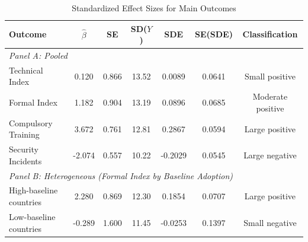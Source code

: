 \begin{table}[H]
\centering
\caption{Standardized Effect Sizes for Main Outcomes}
\label{tab:sde}
\begin{threeparttable}
\begin{tabular}{lcccccc}
\toprule
Outcome & $\hat{\beta}$ & SE & SD($Y$) & SDE & SE(SDE) & Classification \\
\midrule
\multicolumn{7}{l}{\textit{Panel A: Pooled}} \\
Technical Index & 0.120 & 0.866 & 13.52 & 0.0089 & 0.0641 & Small positive \\
Formal Index & 1.182 & 0.904 & 13.19 & 0.0896 & 0.0685 & Moderate positive \\
Compulsory Training & 3.672 & 0.761 & 12.81 & 0.2867 & 0.0594 & Large positive \\
Security Incidents & -2.074 & 0.557 & 10.22 & -0.2029 & 0.0545 & Large negative \\
\midrule
\multicolumn{7}{l}{\textit{Panel B: Heterogeneous (Formal Index by Baseline Adoption)}} \\
High-baseline countries & 2.280 & 0.869 & 12.30 & 0.1854 & 0.0707 & Large positive \\
Low-baseline countries & -0.289 & 1.600 & 11.45 & -0.0253 & 0.1397 & Small negative \\
\bottomrule
\end{tabular}
\begin{tablenotes}[flushleft]
\small

\end{tablenotes}
\end{threeparttable}
\end{table}
